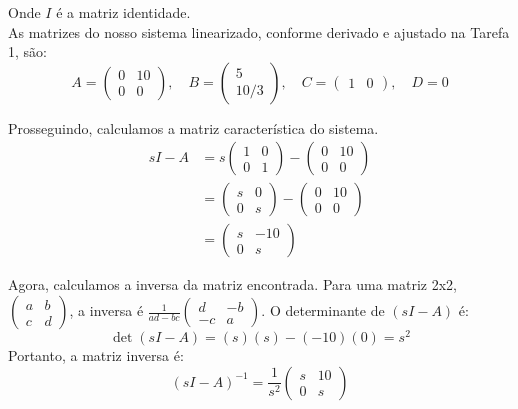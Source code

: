 \documentclass[a4paper,11pt]{article}
\begin{document}
Onde $I$ é a matriz identidade.\\


As matrizes do nosso sistema linearizado, conforme derivado e ajustado na Tarefa 1, são:
$$ A = \begin{pmatrix} 0 & 10 \\ 0 & 0 \end{pmatrix}, \quad B = \begin{pmatrix} 5 \\ 10/3 \end{pmatrix}, \quad C = \begin{pmatrix} 1 & 0 \end{pmatrix}, \quad D = 0 $$

Prosseguindo, calculamos a matriz característica do sistema.
\begin{align*}
    sI - A &= s\begin{pmatrix} 1 & 0 \\ 0 & 1 \end{pmatrix} - \begin{pmatrix} 0 & 10 \\ 0 & 0 \end{pmatrix} \\
           &= \begin{pmatrix} s & 0 \\ 0 & s \end{pmatrix} - \begin{pmatrix} 0 & 10 \\ 0 & 0 \end{pmatrix} \\
           &= \begin{pmatrix} s & -10 \\ 0 & s \end{pmatrix}
\end{align*}

Agora, calculamos a inversa da matriz encontrada. Para uma matriz 2x2, $\begin{pmatrix} a & b \\ c & d \end{pmatrix}$, a inversa é $\frac{1}{ad-bc}\begin{pmatrix} d & -b \\ -c & a \end{pmatrix}$.
O determinante de $(sI - A)$ é:
$$ \det(sI - A) = (s)(s) - (-10)(0) = s^2 $$
Portanto, a matriz inversa é:
\begin{equation}
    (sI - A)^{-1} = \frac{1}{s^2} \begin{pmatrix} s & 10 \\ 0 & s \end{pmatrix}
\end{equation}
\end{document}
